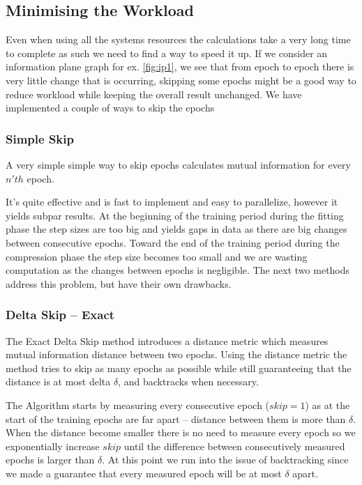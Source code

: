 \subsection{Minimising the Workload}

Even when using all the systems resources the calculations take a very long
time to complete as such we need to find a way to speed it up. If we consider an
information plane graph for ex. \autoref{fig:ip1}, we see that from epoch to
epoch there is very little change that is occurring, skipping some epochs might
be a good way to reduce workload while keeping the overall result unchanged. We
have implemented a couple of ways to skip the epochs 

\subsubsection{Simple Skip}
  
  A very simple simple way to skip epochs calculates mutual information for
  every $n'th$ epoch.

  It's quite effective and is fast to implement and easy to parallelize, however
  it yields subpar results. At the beginning of the training period during the
  fitting phase the step sizes are too big and yields gaps in data as there are
  big changes between consecutive epochs. Toward the end of the training period
  during the compression phase the step size becomes too small and we are
  wasting computation as the changes between epochs is negligible. The next two
  methods address this problem, but have their own drawbacks.

\subsubsection{Delta Skip -- Exact}

  The Exact Delta Skip method introduces a distance metric which measures
  mutual information distance between two epochs. Using the distance metric the
  method tries to skip as many epochs as possible while still guaranteeing that
  the distance is at most delta $\delta$, and backtracks when necessary.

  The Algorithm starts by measuring every consecutive epoch ($skip = 1$) as at
  the start of the training epochs are far apart -- distance between them is
  more than $\delta$. When the distance become smaller there is no need to
  measure every epoch so we exponentially increase $skip$ until the difference
  between consecutively measured epochs is larger than $\delta$. At this point
  we run into the issue of backtracking since we made a guarantee that every
  measured epoch will be at most $\delta$ apart.

